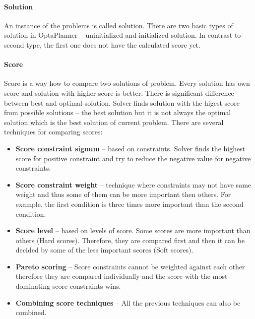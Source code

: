 \paragraph{Solution}
An instance of the problems is called solution. There are two basic types of solution in OptaPlanner -- uninitialized and initialized solution. In contrast to second type, the first one does not have the calculated score yet.

\paragraph{Score}\label{score}
Score is a way how to compare two solutions of problem. Every solution has own score and solution with higher score is better. There is significant difference between best and optimal solution. Solver finds solution with the higest score from possible solutions -- the best solution but it is not always the optimal solution which is the best solution of current problem. There are several techniques for comparing scores:
\begin{itemize}
\item \textbf{Score constraint signum} -- based on constraints. Solver finds the highest score for positive constraint and try to reduce the negative value for negative constraints.
\item \textbf{Score constraint weight} -- technique where constraints may not have same weight and thus some of them can be more important then others. For example, the first condition is three times more important than the second condition.
\item \textbf{Score level} -- based on levels of score. Some scores are more important than others (Hard scores). Therefore, they are compared first and then it can be decided by some of the less important scores (Soft scores).
\item \textbf{Pareto scoring} -- Score constraints cannot be weighted against each other therefore they are compared individually and the score with the most dominating score constraints wins.
\item \textbf{Combining score techniques} -- All the previous techniques can also be combined.
\end{itemize}

